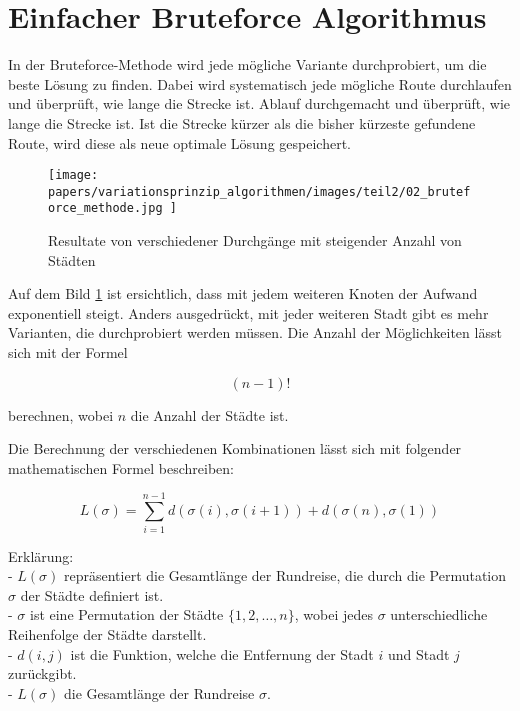%
%
%
%
\section{Einfacher Bruteforce Algorithmus
\label{variationsprinzip_algorithmen:section:bruteforce}}
In der Bruteforce-Methode wird jede mögliche Variante durchprobiert, 
um die beste Lösung zu finden. Dabei wird systematisch jede mögliche
Route durchlaufen und überprüft, wie lange die Strecke ist.  
Ablauf durchgemacht und überprüft, wie lange die Strecke ist.
Ist die Strecke kürzer als die bisher kürzeste gefundene Route, 
wird diese als neue optimale Lösung gespeichert.

\begin{figure} [h]
	\centering
	\texttt{[image: 
        papers/variationsprinzip\_algorithmen/images/teil2/02\_bruteforce\_methode.jpg
        ]}
	\caption{Resultate von verschiedener Durchgänge mit steigender Anzahl von Städten}
	\label{fig:results_bruteforce}
\end{figure}

Auf dem Bild \ref*{fig:results_bruteforce} ist ersichtlich, dass mit 
jedem weiteren Knoten der Aufwand exponentiell steigt. Anders 
ausgedrückt, mit jeder weiteren Stadt gibt es mehr Varianten, die 
durchprobiert werden müssen. Die Anzahl der Möglichkeiten lässt sich 
mit der Formel

\begin{equation}
    (n-1)!
\end{equation}

berechnen, wobei \(n\) die Anzahl der Städte ist.

Die Berechnung der verschiedenen Kombinationen lässt sich mit folgender 
mathematischen Formel beschreiben:

\begin{equation}
    \label{eq:bruteforce_min_formula}
    L(\sigma) = \sum_{i=1}^{n-1} d(\sigma(i), \sigma(i+1)) + d(\sigma(n), \sigma(1))
\end{equation}

Erklärung:\\
- \( L(\sigma) \)  repräsentiert die Gesamtlänge der Rundreise, die durch 
die Permutation \( \sigma \) der Städte definiert ist.\\
- \( \sigma \) ist eine Permutation der Städte \( \{1, 2, \ldots, n\} \),
wobei jedes \( \sigma \) unterschiedliche Reihenfolge der Städte darstellt.\\
- \( d(i, j) \) ist die Funktion, welche die Entfernung der Stadt \( i \) und 
Stadt \( j \) zurückgibt.\\
- \( L(\sigma) \) die Gesamtlänge der Rundreise \( \sigma \).\\


